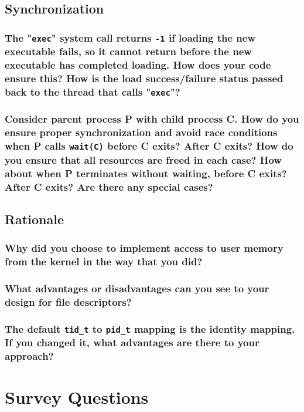 \documentclass[sigconf, nonacm, balance=false, urlbreakonhyphens=true]{acmart}
\begin{document}
        \subsection{Synchronization}

            \subsubsection{The "\texttt{exec}" system call returns \texttt{-1} if loading the new executable fails, so it cannot return before the new executable has completed loading.  How does your code ensure this?  How is the load success/failure status passed back to the thread that calls "\texttt{exec}"? }

            \subsubsection{Consider parent process P with child process C.  How do you ensure proper synchronization and avoid race conditions when P calls \texttt{wait(C)} before C exits?  After C exits?  How do you ensure that all resources are freed in each case?  How about when P terminates without waiting, before C exits?  After C exits?  Are there any special cases? }

        \subsection{Rationale}

            \subsubsection{Why did you choose to implement access to user memory from the kernel in the way that you did? }

            \subsubsection{What advantages or disadvantages can you see to your design for file descriptors? }

            \subsubsection{The default \texttt{tid\_t} to \texttt{pid\_t} mapping is the identity mapping.  If you changed it, what advantages are there to your approach? }
    
    \section{Survey Questions}
\end{document}
